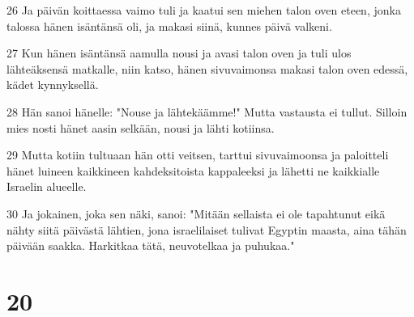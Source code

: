 \par 26 Ja päivän koittaessa vaimo tuli ja kaatui sen miehen talon oven eteen, jonka talossa hänen isäntänsä oli, ja makasi siinä, kunnes päivä valkeni.
\par 27 Kun hänen isäntänsä aamulla nousi ja avasi talon oven ja tuli ulos lähteäksensä matkalle, niin katso, hänen sivuvaimonsa makasi talon oven edessä, kädet kynnyksellä.
\par 28 Hän sanoi hänelle: "Nouse ja lähtekäämme!" Mutta vastausta ei tullut. Silloin mies nosti hänet aasin selkään, nousi ja lähti kotiinsa.
\par 29 Mutta kotiin tultuaan hän otti veitsen, tarttui sivuvaimoonsa ja paloitteli hänet luineen kaikkineen kahdeksitoista kappaleeksi ja lähetti ne kaikkialle Israelin alueelle.
\par 30 Ja jokainen, joka sen näki, sanoi: "Mitään sellaista ei ole tapahtunut eikä nähty siitä päivästä lähtien, jona israelilaiset tulivat Egyptin maasta, aina tähän päivään saakka. Harkitkaa tätä, neuvotelkaa ja puhukaa."

\chapter{20}

